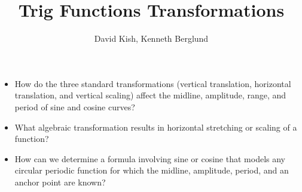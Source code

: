 \documentclass{ximera}
\author{David Kish, Kenneth Berglund}
\title{Trig Functions Transformations}
\begin{document}
\begin{abstract}
  
\end{abstract}
\maketitle

%
%
%


%
\begin{motivatingQuestions}
\begin{itemize}[label=\textbullet]
\item{}
How do the three standard transformations (vertical translation, horizontal translation, and vertical scaling) affect the midline, amplitude, range, and period of sine and cosine curves?%
\item{}
What algebraic transformation results in horizontal stretching or scaling of a function?%
\item{}
How can we determine a formula involving sine or cosine that models any circular periodic function for which the midline, amplitude, period, and an anchor point are known?%
\end{itemize}
\end{motivatingQuestions}
\end{document}
